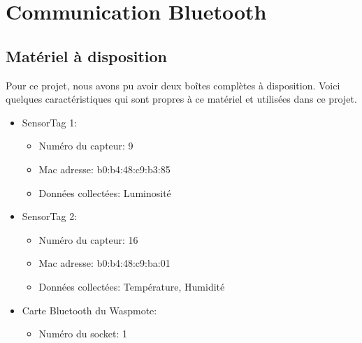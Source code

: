 \newpage
\section{Communication Bluetooth}
\subsection{Matériel à disposition}
Pour ce projet, nous avons pu avoir deux boîtes complètes à disposition. Voici quelques caractéristiques qui sont propres à ce matériel et utilisées dans ce projet.
\begin{itemize}
	\item SensorTag 1:
	\begin{itemize}
		\item Numéro du capteur: 9
		\item Mac adresse: b0:b4:48:c9:b3:85
		\item Données collectées: Luminosité 
	\end{itemize}
	\item SensorTag 2:
	\begin{itemize}
		\item Numéro du capteur: 16
		\item Mac adresse: b0:b4:48:c9:ba:01
		\item Données collectées: Température, Humidité 
	\end{itemize}
	\item Carte Bluetooth du Waspmote:
	\begin{itemize}
		\item Numéro du socket: 1
	\end{itemize}
\end{itemize}